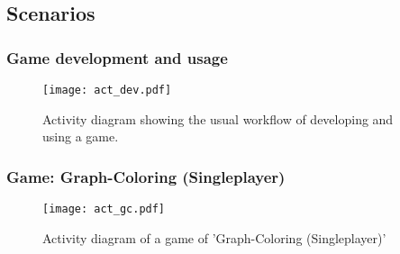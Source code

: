 \subsection{Scenarios}

\subsubsection{Game development and usage}
\begin{figure}[h!]
	\centering
	\texttt{[image: act\_dev.pdf]}
	\caption{Activity diagram showing the usual workflow of developing and using a game.}
	\label{img:ACTDEV}
\end{figure}
\subsubsection{Game: Graph-Coloring (Singleplayer)}
\begin{figure}[h!]
	\centering
	\texttt{[image: act\_gc.pdf]}
	\caption{Activity diagram of a game of 'Graph-Coloring (Singleplayer)'}
	\label{img:ACTGC}
\end{figure}